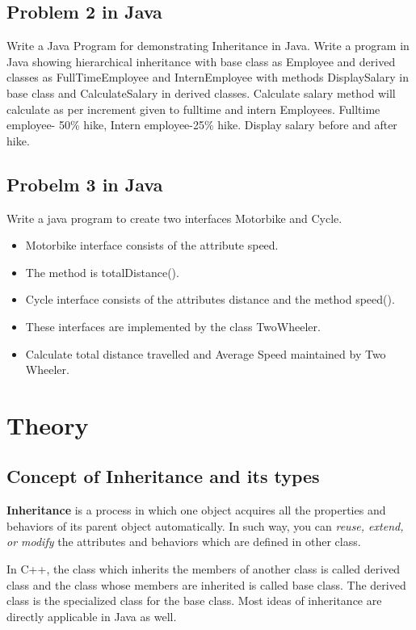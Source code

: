 \documentclass[11pt]{article}
\begin{document}
\subsection{Problem 2 in Java}
Write a Java Program for demonstrating Inheritance in Java.
Write a program in Java showing hierarchical inheritance with base class as Employee and
derived classes as FullTimeEmployee and InternEmployee with methods DisplaySalary in
base class and CalculateSalary in derived classes.
Calculate salary method will calculate as per increment given to fulltime and intern
Employees. Fulltime employee- 50\% hike, Intern employee-25\% hike. Display salary
before and after hike.
\subsection{Probelm 3 in Java}
Write a java program to create two interfaces Motorbike and Cycle.
\begin{itemize}
	\item Motorbike interface consists of the attribute speed.
	\item The method is totalDistance().
	\item Cycle interface consists of the attributes distance and the method speed().
	\item These interfaces are implemented by the class TwoWheeler.
	\item Calculate total distance travelled and Average Speed maintained by Two Wheeler.
\end{itemize}

\section{Theory}

\subsection{Concept of Inheritance and its types}
\textbf{Inheritance} is a process in which one object acquires all the properties and behaviors of its parent object automatically. In such way, you can \textit{reuse, extend, or modify} the attributes and behaviors which are defined in other class.

In C++, the class which inherits the members of another class is called derived class and the class whose members are inherited is called base class. The derived class is the specialized class for the base class. Most ideas of inheritance are directly applicable in Java as well.
\end{document}
